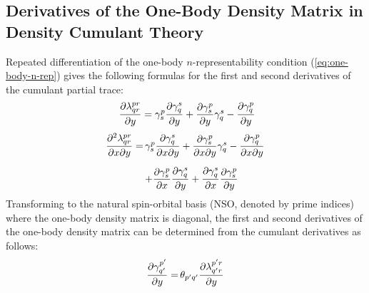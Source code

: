 \begin{subappendices}
\section{%
    Derivatives of the One-Body Density Matrix in Density Cumulant Theory
}
\label{sec:appendix}

Repeated differentiation of the one-body \(n\)-representability condition
(\cref{eq:one-body-n-rep}) gives the following formulas for the first and second
derivatives of the cumulant partial trace:
\begin{equation}
    \begin{array}{r@{\,}l}
        \dfrac{\partial \lambda^{pr}_{qr}}{\partial{y}}
        =
        \gamma^p_s
        \dfrac{\partial \gamma^s_q}{\partial{y}}
        +
        \dfrac{\partial \gamma^p_s}{\partial{y}}
        \gamma^s_q
        -
        \dfrac{\partial \gamma^p_q}{\partial{y}}
    \end{array}
\end{equation}
\begin{equation}
    \begin{array}{r@{\,}l}
        \dfrac{\partial^2 \lambda^{pr}_{qr}}{%
            \partial{x}
            \partial{y}
        }
        =
        &
        \gamma^p_s
        \dfrac{\partial \gamma^s_q}{%
            \partial{x}
            \partial{y}
        }
        +
        \dfrac{\partial \gamma^p_s}{%
            \partial{x} \partial{y}
        }
        \gamma^s_q
        -
        \dfrac{\partial \gamma^p_q}{%
            \partial{x}
            \partial{y}
        }
        \\[15pt]
        &
        +
        \dfrac{\partial \gamma^p_s}{\partial{x}}
        \dfrac{\partial \gamma^s_q}{\partial{y}}
        +
        \dfrac{\partial \gamma^s_q}{\partial{x}}
        \dfrac{\partial \gamma^p_s}{\partial{y}}
    \end{array}
\end{equation}
Transforming to the natural spin-orbital basis (NSO, denoted by prime indices) where the
one-body density matrix is diagonal, the first and second derivatives of the one-body density matrix can be determined from the cumulant derivatives as follows:
\begin{equation}
    \label{eq:one-body-n-rep-gradient}
    \begin{array}{r@{\,}l}
        \dfrac{\partial \gamma^{p'}_{q'}}{\partial{y}}
        =
        &
        \theta_{p'q'}
        \dfrac{\partial \lambda^{p'r}_{q'r}}{\partial{y}}

\end{array}
\end{equation}
\end{subappendices}
